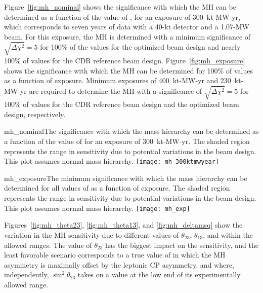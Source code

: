 Figure~\ref{fig:mh_nominal} shows the significance with which the MH can be determined as a function of the value of \deltacp, for an exposure of 300~kt-MW-yr, which corresponds to seven years of data with a 40-kt detector and a 1.07-MW beam.  For this exposure, the MH is determined with a minimum significance of $\sqrt{\overline{\Delta\chi^{2}}} = 5$ for 100\% of the \deltacp values for the optimized beam design and nearly 100\% of \deltacp values for the CDR reference beam design.  Figure~\ref{fig:mh_exposure} shows the significance with which the MH can be determined for 100\% of \deltacp values as a function of exposure.  Minimum exposures of 400~kt-MW-yr and 230~kt-MW-yr are required to determine the MH with a significance of $\sqrt{\overline{\Delta\chi^2}} = 5$ for 100\% of \deltacp values for the CDR reference beam design and the optimized beam design, respectively.

\begin{cdrfigure}{mh_nominal}{The significance with which the mass hierarchy can be determined as a function of the value of \deltacp for an exposure of 300~kt-MW-yr.  The shaded region represents the range in sensitivity due to potential variations in the beam design.  This plot assumes normal mass hierarchy.}
 \texttt{[image: mh\_300ktmwyear]}
\end{cdrfigure}

\begin{cdrfigure}{mh_exposure}{The minimum significance with which the mass hierarchy can be determined for all values of \deltacp as a function of exposure.  The shaded region represents the range in sensitivity due to potential variations in the beam design. This plot assumes normal mass hierarchy.}
 \texttt{[image: mh\_exp]}
\end{cdrfigure}

Figures~\ref{fig:mh_theta23}, \ref{fig:mh_theta13}, and \ref{fig:mh_deltamsq} show the variation in the MH sensitivity due to different values of $\theta_{23}$, $\theta_{13}$, and  within the allowed ranges.  The value of $\theta_{23}$ has the biggest impact on the sensitivity, and the least favorable scenario corresponds to a true value of \deltacp in which the MH asymmetry
is maximally offset by the leptonic CP asymmetry, and where, independently, 
$\sin^2{\theta_{23}}$ takes on a value at the low end of its 
experimentally allowed range.

